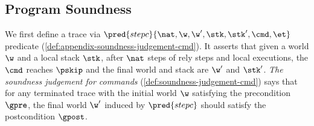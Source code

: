 \subsection{Program Soundness}

We first define a trace via \( \pred{stepc}{\nat, \w, \w', \stk, \stk', \cmd, \et} \) predicate (\cref{def:appendix-soundness-judgement-cmd}).
It asserts that given a world \( \w \) and a local stack \( \stk \), after \( \nat \) steps of rely steps and local executions, the \( \cmd \) reaches \( \pskip \) and the final world and stack are \( \w'\) and \( \stk' \).
\emph{The soundness judgement for commands} (\cref{def:soundness-judgement-cmd}) says that
for any terminated trace with the initial world \( \w \) satisfying the precondition \( \gpre \), the final world \( \w' \) induced  by \( \pred{stepc} \) should satisfy the postcondition \( \gpost \).


